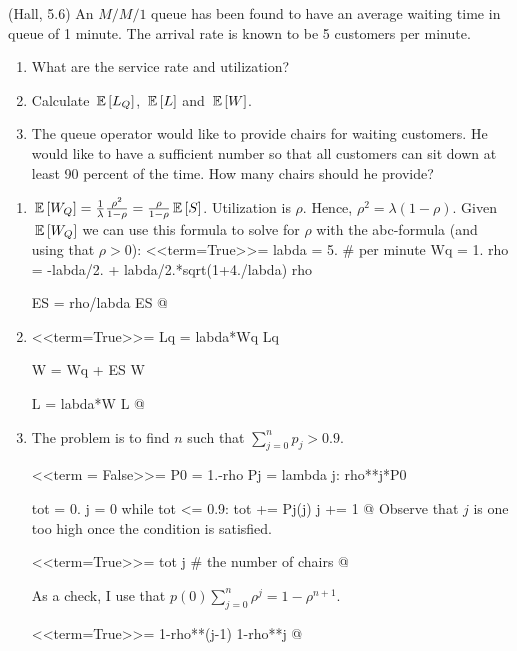 \begin{question}(Hall, 5.6)
  An $M/M/1$ queue has been found to have an average waiting time in queue of 1 minute. The arrival rate is known to be 5 customers per minute.
  \begin{enumerate}
  \item What are the service rate and utilization?
  \item Calculate $\,\mathbb{E}\left[L_Q\right]$,  $\,\mathbb{E}\left[L\right]$ and $\,\mathbb{E}\left[W\right]$.
  \item The queue operator would like to provide chairs for waiting customers. He would like to have a sufficient number so that all customers can sit down at least 90 percent of the time. How many chairs should he provide?
  \end{enumerate}
  
    \begin{solution}
      \begin{enumerate}
      \item 
      $\,\mathbb{E}\left[W_Q\right] =
      \frac{1}{\lambda}\frac{\rho^2}{1-\rho}=\frac{\rho}{1-\rho} \,\mathbb{E}\left[S\right]$.
      Utilization is $\rho$.  Hence, $\rho^2 = \lambda
      (1-\rho)$.
      Given $\,\mathbb{E}\left[W_Q\right]$ we can use this formula to solve for $\rho$ with
      the abc-formula (and using that $\rho > 0$):
<<term=True>>=
labda = 5. # per minute
Wq = 1.
rho = -labda/2. + labda/2.*sqrt(1+4./labda)
rho 

ES = rho/labda
ES
@ 

\item 

<<term=True>>=
Lq = labda*Wq
Lq

W = Wq + ES
W

L = labda*W
L
@ 

\item 

The problem is to find $n$ such that
      $\sum_{j=0}^n p_j > 0.9$.

<<term = False>>=
P0 = 1.-rho
Pj = lambda j: rho**j*P0

tot = 0.
j = 0
while tot <= 0.9:
   tot += Pj(j)
   j += 1
@ 
Observe that $j$ is one too high once the condition is satisfied.

<<term=True>>=
tot
j  # the number of chairs
@      

As a check, I use that $p(0) \sum_{j=0}^n \rho^j = 1-\rho^{n+1}$.

<<term=True>>=
1-rho**(j-1)
1-rho**j
@ 

  \end{enumerate}

    \end{solution}
\end{question}

